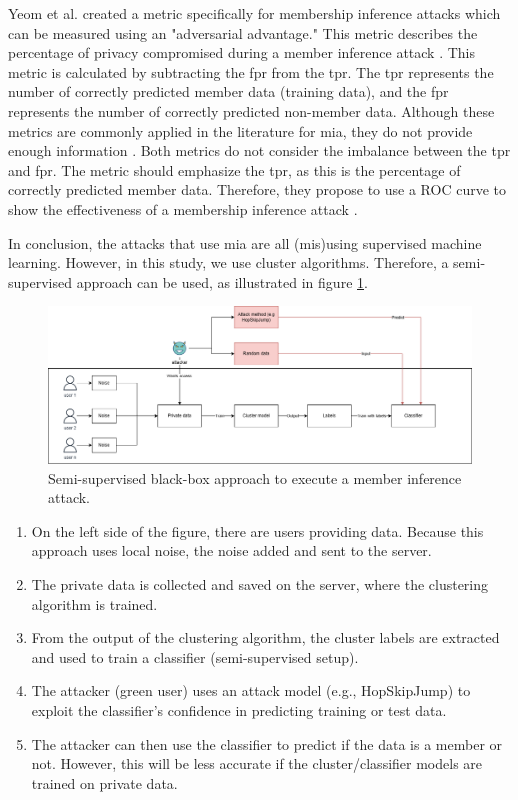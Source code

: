 Yeom et al. created a metric specifically for membership inference attacks which can be measured using an "adversarial advantage."
This metric describes the percentage of privacy compromised during a member inference attack \citep{yeom_privacy_2018}.
This metric is calculated by subtracting the \gls{fpr} from the \gls{tpr}.
The \gls{tpr} represents the number of correctly predicted member data (training data), and the \gls{fpr} represents the number of correctly predicted non-member data.
Although these metrics are commonly applied in the literature for \gls{mia}, they do not provide enough information \citep{carlini_membership_2022}.
Both metrics do not consider the imbalance between the \gls{tpr} and \gls{fpr}.
The metric should emphasize the \gls{tpr}, as this is the percentage of correctly predicted member data.
Therefore, they propose to use a ROC curve to show the effectiveness of a membership inference attack \citep{carlini_membership_2022}. \newline

In conclusion, the attacks that use \gls{mia} are all (mis)using supervised machine learning.
However, in this study, we use cluster algorithms.
Therefore, a semi-supervised approach can be used, as illustrated in figure \ref{figure:MIA-semi-supervised}.
\newpage
\begin{figure}[h]
  \includegraphics[width=1\textwidth]{TheorethicalFramework/Differential privacy/master-thesis-MIA.png}
  \caption{Semi-supervised black-box approach to execute a member inference attack.}
  \label{figure:MIA-semi-supervised}
\end{figure}

\begin{enumerate}
  \item On the left side of the figure, there are users providing data. Because this approach uses local noise, the noise added and sent to the server.
  \item The private data is collected and saved on the server, where the clustering algorithm is trained.
  \item From the output of the clustering algorithm, the cluster labels are extracted and used to train a classifier (semi-supervised setup).
  \item The attacker (green user) uses an attack model (e.g., HopSkipJump) to exploit the classifier's confidence in predicting training or test data.
  \item The attacker can then use the classifier to predict if the data is a member or not.
        However, this will be less accurate if the cluster/classifier models are trained on private data.
\end{enumerate}

